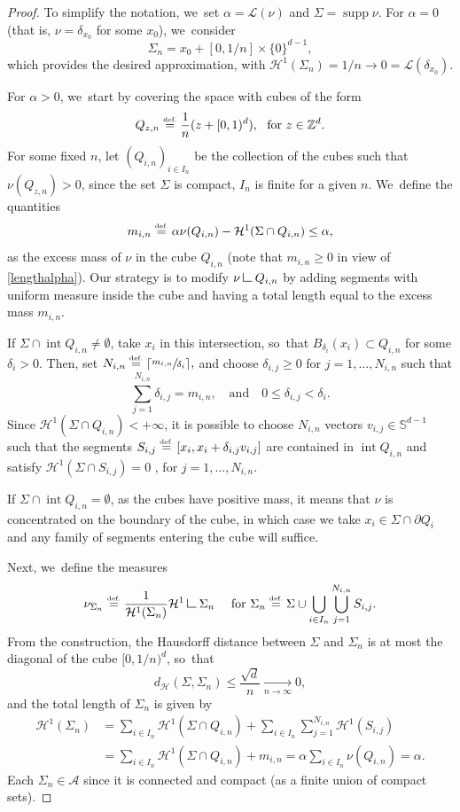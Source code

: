 \documentclass[10pt]{amsart}
\theoremstyle{definition}
\newcommand{\eqdef}{\ensuremath{\stackrel{\mbox{\upshape\tiny def.}}{=}}}
\newcommand\LM[1]{\hbox{\vrule width.5pt \vbox to#1pt{\vfill \hrule width#1pt height.5pt}}}
\newcommand\LL{{\mathchoice {\>\LM7\>}{\>\LM7\>}{\,\LM5\,}{\,\LM{3.35}\,}}}
\newcommand{\mres}{\LL}
\newcommand\A{\mathcal{A}}
\newcommand\cH{\mathcal{H}}
\DeclareMathOperator{\supp}{supp}
\DeclareMathOperator{\inte}{int}
\newcommand{\distH}{d_{\mathcal{H}}}
\newcommand{\ci}[2]{ \left[ #1, #2 \right] }
\begin{document}
\begin{proof}
To simplify the notation, we~set $\alpha = \mathcal{L}(\nu)$ and $\Sigma = \supp\nu$.
For $\alpha=0$ (that is, $\nu=\delta_{x_0}$ for some $x_0$), we~consider
\[
\Sigma_n = x_0 + \ci{0}{1/n}\times \{0\}^{d-1},
\]
which provides the desired approximation, with $\cH^1(\Sigma_n) = 1/n \to 0 = \mathcal{L}(\delta_{x_0})$.

For $\alpha>0$, we~start by covering the space with cubes of the form
\[
Q_{z,n} \eqdef \frac{1}{n}( z + [0,1)^d), \ \text{ for $z \in \mathbb{Z}^d$}.
\]
For some fixed $n$, let $\left(Q_{i,n}\right)_{i \in I_n}$ be the collection of the cubes such that $\nu\left(Q_{z,n}\right) > 0$, since the set $\Sigma$ is compact, $I_n$ is finite for a given $n$. We~define the quantities
\[
m_{i,n} \eqdef \alpha \nu(Q_{i,n}) - \cH^1(\Sigma \cap Q_{i,n}) \le \alpha,
\]
as the excess mass of $\nu$ in the cube $Q_{i,n}$ (note that $m_{i,n}\geq 0$ in view of \eqref{lengthalpha}). Our strategy is to modify $\nu\mres Q_{i,n}$ by adding segments with uniform measure inside the cube and having a total length equal to the excess mass $m_{i,n}$.

If $\Sigma \cap \inte Q_{i,n} \neq \emptyset$, take $x_i$ in this intersection, so~that $B_{\delta_i}(x_i) \subset Q_{i,n}$ for some $\delta_i > 0$. Then, set
$
N_{i,n} \eqdef\lceil \sfrac{m_{i,n}}{\delta_i}\rceil,
$
and choose $\delta_{i,j}\ge 0$ for $j = 1, \dots, N_{i,n}$ such that
\[
\sum_{j = 1}^{N_{i,n}} \delta_{i,j} = m_{i,n}, \quad\text{and}\quad 0 \le \delta_{i,j} < \delta_i.
\]
Since $\cH^1(\Sigma\cap Q_{i,n})<+\infty$, it is possible to choose $N_{i,n}$ vectors $v_{i,j} \in \mathbb{S}^{d-1}$ such that the segments $S_{i,j} \eqdef [x_i, x_i + \delta_{i,j}v_{i,j}]$ are contained in $\inte Q_{i,n}$ and satisfy $\cH^1(\Sigma \cap S_{i,j}) = 0$ , for $j = 1, \dots, N_{i,n}$.

If $\Sigma \cap \inte Q_{i,n} = \emptyset$, as the cubes have positive mass, it means that $\nu$ is concentrated on the boundary of the cube, in which case we take $x_i \in \Sigma \cap \partial Q_i$ and any family of segments entering the cube will suffice.

Next, we~define the measures
\[
\nu_{\Sigma_n}
\eqdef
\frac{1}{\cH^1(\Sigma_n)} \cH^1\mres \Sigma_n
\quad \text{ for }
\Sigma_n \eqdef \Sigma \cup \bigcup_{ i \in I_n}\bigcup_{j = 1}^{N_{i,n}} S_{i,j}.
\]
From the construction, the Hausdorff distance between $\Sigma$ and $\Sigma_n$ is at most the diagonal of the cube $[0,1/n)^d$, so~that
\[
\distH(\Sigma, \Sigma_n) \le \frac{\sqrt{d}}{n} \xrightarrow[n \to \infty]{} 0,
\]
and the total length of $\Sigma_n$ is given by
\begin{align*}
\cH^1(\Sigma_n)
&=
\sum_{i \in I_n} \cH^1(\Sigma \cap Q_{i,n})
+
\sum_{i \in I_n}\sum_{j = 1}^{N_{i,n}}\cH^1(S_{i,j})\\
&=
\sum_{i \in I_n}
\cH^1(\Sigma \cap Q_{i,n}) + m_{i,n}
=
\alpha
\sum_{i \in I_n}
\nu(Q_{i,n}) = \alpha.
\end{align*}
Each $\Sigma_n\in \A$ since it is connected and compact (as a finite union of compact sets).


\end{proof}
\end{document}

